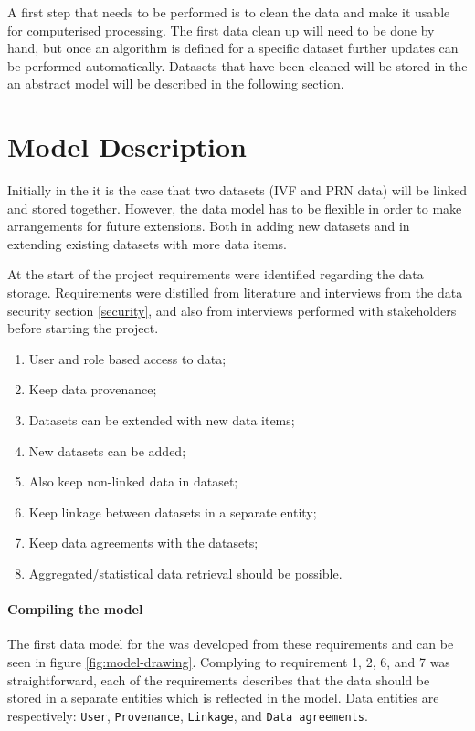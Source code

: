 A first step that needs to be performed is to clean the data and make it usable for computerised processing.
The first data clean up will need to be done by hand, but once an algorithm is defined for a specific dataset further updates can be performed automatically.
Datasets that have been cleaned will be stored in the \ivfsystem{} an abstract model will be described in the following section.

\section{Model Description}
\label{datamodel-model-description}

Initially in the \project it is the case that two datasets (IVF and PRN data) will be linked and stored together.
However, the data model has to be flexible in order to make arrangements for future extensions. 
Both in adding new datasets and in extending existing datasets with more data items.

At the start of the project requirements were identified regarding the data storage. 
Requirements were distilled from literature and interviews from the data security section \ref{security}, and also from interviews performed with stakeholders before starting the project.

\begin{enumerate}[topsep=0pt, itemsep=-1ex]
	\item User and role based access to data;
	\item Keep data provenance;
	\item Datasets can be extended with new data items;
	\item New datasets can be added;
	\item Also keep non-linked data in dataset;
	\item Keep linkage between datasets in a separate entity;
	\item Keep data agreements with the datasets;
	\item Aggregated/statistical data retrieval should be possible.
\end{enumerate}

\paragraph{Compiling the model}
\label{datamodel-compiling}

The first data model for the \ivfsystem{} was developed from these requirements and can be seen in figure \ref{fig:model-drawing}.
Complying to requirement 1, 2, 6, and 7 was straightforward, each of the requirements describes that the data should be stored in a separate entities which is reflected in the model.
Data entities are respectively: {\tt User}, {\tt Provenance}, {\tt Linkage}, and {\tt Data agreements}.

